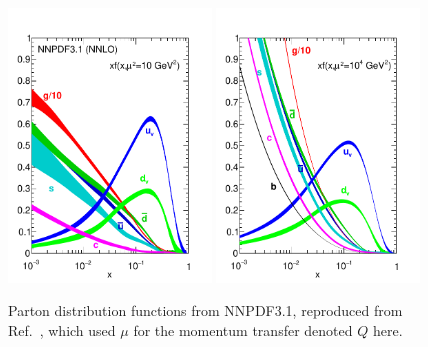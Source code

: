 \begin{figure}[htbp]
  \begin{center}
    \includegraphics[width=0.48\textwidth]{standardModel/nnpdf31nnlo-10.pdf}
    \includegraphics[width=0.48\textwidth]{standardModel/nnpdf31nnlo-1e4.pdf}
    \caption[Parton distribution functions]{
        Parton distribution functions from NNPDF3.1, reproduced from Ref.~\cite{Ball:2017nwa}, which used $\mu$ for the momentum transfer denoted $Q$ here.
      }\label{fig:nnpdf}
  \end{center}
\end{figure}


